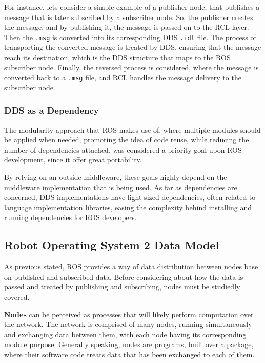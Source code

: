 For instance, lets consider a simple example of a publisher node, that publishes a message that is later subscribed by a subscriber node. So, the publisher creates the message, and by publishing it, the message is passed on to the RCL layer. Then the \texttt{.msg} is converted into its corresponding DDS \texttt{.idl} file. The process of transporting the converted message is treated by DDS, ensuring that the message reach its destination, which is the DDS structure that maps to the ROS subscriber node. Finally, the reversed process is considered, where the message is converted back to a \texttt{.msg} file, and RCL handles the message delivery to the subscriber node. 


\subsubsection{DDS as a Dependency}

The modularity approach that ROS makes use of, where multiple modules should be applied when needed, promoting the idea of code reuse, while reducing the number of dependencies attached, was considered a priority goal upon ROS development, since it offer great portability.
                
By relying on an outside middleware, these goals highly depend on the middleware implementation that is being used. As far as dependencies are concerned, DDS implementations have light sized dependencies, often related to language implementation libraries, easing the complexity behind installing and running dependencies for ROS developers.


\subsection{Robot Operating System 2 Data Model}

As previous stated, ROS provides a way of data distribution between nodes base on published and subscribed data. Before considering about how the data is passed and treated by publishing and subscribing, nodes must be studiedly covered.
            
\textbf{Nodes} can be perceived as processes that will likely perform computation over the network. The network is comprised of many nodes, running simultaneously and exchanging data between them, with each node having its corresponding module purpose. Generally speaking, nodes are programs, built over a package, where their software code treats data that has been exchanged to each of them.

